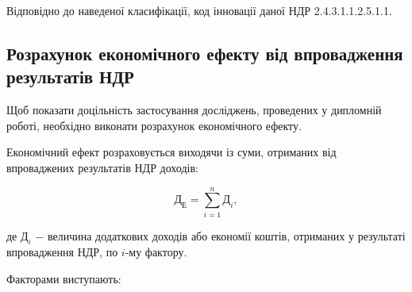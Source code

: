 Відповідно до наведеної класифікації, код інновації даної НДР 2.4.3.1.1.2.5.1.1.

\subsection{Розрахунок економічного ефекту від впровадження результатів НДР}

Щоб показати доцільність застосування досліджень, проведених у дипломній роботі, необхідно виконати розрахунок економічного ефекту.

Економічний ефект розраховується виходячи із суми, отриманих від впроваджених результатів НДР доходів: 

\begin{equation}\label{eq:economy11}
	\text{Д}_{\text{Е}} = \sum_{i=1}^{n}\text{Д}_{i},
\end{equation}

\noindent де $\text{Д}_{i}$ $-$ величина додаткових доходів або економії коштів, отриманих у результаті впровадження НДР, по $i$-му фактору. 

\vspace{1.5em}

Факторами виступають:

